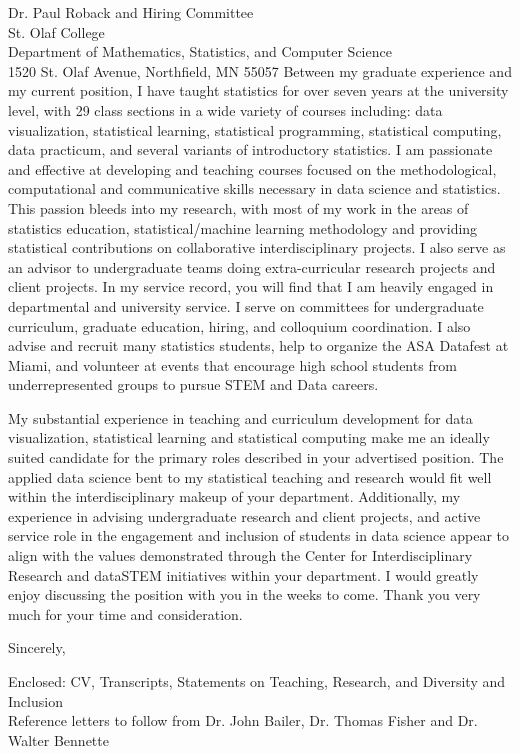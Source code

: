 \documentclass[11pt]{letter}\usepackage[]{graphicx}\usepackage[]{color}
\begin{document}
\begin{letter}{Dr. Paul Roback and Hiring Committee\\
St. Olaf College \\
Department of Mathematics, Statistics, and Computer Science\\
1520 St. Olaf Avenue, Northfield, MN  55057
}
Between my graduate experience and my current position, I have taught statistics for over seven years at the university level, with 29 class sections in a wide variety of courses including: data visualization, statistical learning, statistical programming, statistical computing, data practicum, and several variants of introductory statistics. I am passionate and effective at developing and teaching courses focused on the methodological, computational and communicative skills necessary in data science and statistics. This passion bleeds into my research, with most of my work in the areas of statistics education, statistical/machine learning methodology and providing statistical contributions on collaborative interdisciplinary projects. I also serve as an advisor to undergraduate teams doing extra-curricular research projects and client projects. In my service record, you will find that I am heavily engaged in departmental and university service. I serve on committees for undergraduate curriculum, graduate education, hiring, and colloquium coordination. I also advise and recruit many statistics students, help to organize the ASA Datafest at Miami, and volunteer at events that encourage high school students from underrepresented groups to pursue STEM and Data careers. 

My substantial experience in teaching and curriculum development for data visualization, statistical learning and statistical computing make me an ideally suited candidate for the primary roles described in your advertised position. The applied data science bent to my statistical teaching and research would fit well within the interdisciplinary makeup of your department. Additionally, my experience in advising undergraduate research and client projects, and active service role in the engagement and inclusion of students in data science appear to align with the values demonstrated through the Center for Interdisciplinary Research and dataSTEM initiatives within your department. I would greatly enjoy discussing the position with you in the weeks to come. Thank you very much for your time and consideration.

\addtolength{\medskipamount}{-1\medskipamount}
\closing{Sincerely,}


Enclosed: CV, Transcripts, Statements on Teaching, Research, and Diversity and Inclusion\\
Reference letters to follow from Dr. John Bailer, Dr. Thomas Fisher and Dr. Walter Bennette


\end{letter}
\end{document}

